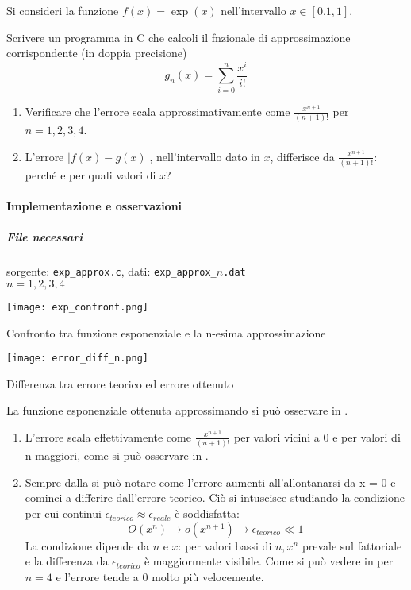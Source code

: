 Si consideri la funzione \( f(x) = \exp(x) \) nell'intervallo \( x \in [0.1, 1] \).

Scrivere un programma in C che calcoli il fnzionale di approssimazione corrispondente (in doppia precisione)
\[
g_n(x) = \sum_{i=0}^{n} \frac{x^i}{i!}
\]

\begin{enumerate}
    \item Verificare che l'errore scala approssimativamente come \( \frac{x^{n+1}}{(n+1)!} \) per \( n = 1, 2, 3, 4 \).
    \item L'errore \( \left| f(x) - g(x) \right| \), nell'intervallo dato in \( x \), differisce da \( \frac{x^{n+1}}{(n+1)!} \): perché e per quali valori di \( x \)?
\end{enumerate}


\paragraph{Implementazione e osservazioni}

\subparagraph{File necessari} sorgente: \texttt{exp\_approx.c}, dati: \texttt{exp\_approx\_$n$.dat} \\ $n = 1, 2, 3, 4$

\begin{marginfigure}
	\texttt{[image: exp\_confront.png]}
	\caption{Confronto tra funzione esponenziale e la n-esima approssimazione}
\end{marginfigure}


\begin{marginfigure}
	\texttt{[image: error\_diff\_n.png]}
	\caption{Differenza tra errore teorico ed errore ottenuto}
\end{marginfigure}

La funzione esponenziale ottenuta approssimando si può osservare in .

\begin{enumerate}
	\item L'errore scala effettivamente come $\frac{x^{n+1}}{(n+1)!}$ per valori
	      vicini a 0 e per valori di n maggiori, come si può osservare in .

	\item Sempre dalla  si può notare come l'errore aumenti all'allontanarsi
	      da x = 0 e cominci a differire dall'errore teorico.
	      Ciò si intuscisce studiando la condizione per cui continui $\epsilon_{teorico} \approx \epsilon_{reale}$ è
	      soddisfatta: 
          $$O(x^n) \rightarrow o(x^{n+1}) \rightarrow \epsilon_{teorico} \ll 1$$ 
          La condizione dipende
	      da $n$ e $x$: per valori bassi di $n, x^n$ prevale sul fattoriale e la differenza
	      da $\epsilon_{teorico}$ è maggiormente visibile. Come si può vedere in 
	      per $n = 4$ e l'errore tende a 0 molto più velocemente.

\end{enumerate}

